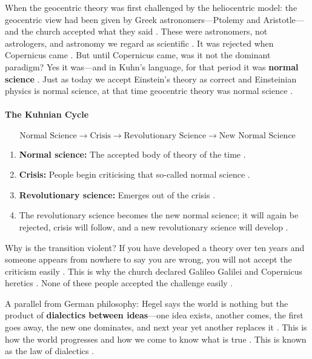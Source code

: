 \begin{ExampleBox}
When the geocentric theory was first challenged by the heliocentric model: the geocentric view had been given by Greek astronomers---Ptolemy and Aristotle---and the church accepted what they said . These were astronomers, not astrologers, and astronomy we regard as scientific . It was rejected when Copernicus came . But until Copernicus came, was it not the dominant paradigm? Yes it was---and in Kuhn's language, for that period it was \textbf{normal science} . Just as today we accept Einstein's theory as correct and Einsteinian physics is normal science, at that time geocentric theory was normal science .
\end{ExampleBox}

\paragraph{The Kuhnian Cycle}
$$\text{Normal Science} \longrightarrow \text{Crisis} \longrightarrow \text{Revolutionary Science} \longrightarrow \text{New Normal Science}$$
\begin{enumerate}
    \item \textbf{Normal science:} The accepted body of theory of the time .
    \item \textbf{Crisis:} People begin criticising that so-called normal science .
    \item \textbf{Revolutionary science:} Emerges out of the crisis .
    \item The revolutionary science becomes the new normal science; it will again be rejected, crisis will follow, and a new revolutionary science will develop .
\end{enumerate}

\begin{CriticalPoint}
Why is the transition violent? If you have developed a theory over ten years and someone appears from nowhere to say you are wrong, you will not accept the criticism easily . This is why the church declared Galileo Galilei and Copernicus heretics . None of these people accepted the challenge easily .
\end{CriticalPoint}

\begin{ComparisonBox}
A parallel from German philosophy: Hegel says the world is nothing but the product of \textbf{dialectics between ideas}---one idea exists, another comes, the first goes away, the new one dominates, and next year yet another replaces it . This is how the world progresses and how we come to know what is true . This is known as the law of dialectics .
\end{ComparisonBox}

